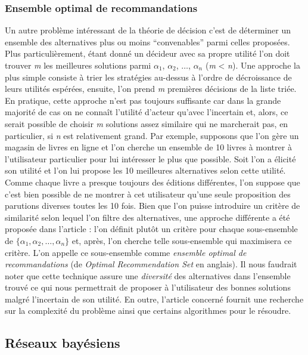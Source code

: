\documentclass[a4paper,11pt]{article}
\theoremstyle{plain}
\begin{document}
\subsubsection{Ensemble optimal de recommandations}
Un autre problème intéressant de la théorie de décision c’est de déterminer un ensemble des alternatives plus ou moins ``convenables'' parmi celles proposées. Plus particulièrement, étant donné un décideur avec sa propre utilité l’on doit trouver \emph{m} les meilleures solutions parmi $\alpha_1$, $\alpha_2$, $\dotsc$, $\alpha_n$ (\emph{m} < \emph{n}). Une approche la plus simple consiste à trier les stratégies au-dessus à l’ordre de décroissance de leurs utilités espérées, ensuite, l’on prend \emph{m} premières décisions de la liste triée. En pratique, cette approche n’est pas toujours suffisante \cite{price_optimal_2005} car dans la grande majorité de cas on ne connaît l’utilité d’acteur qu’avec l’incertain et, alors, ce serait possible de choisir \emph{m} solutions assez similaire qui ne marcherait pas, en particulier, si \emph{n} est relativement grand. Par exemple, supposons que l’on gère un magasin de livres en ligne et l’on cherche un ensemble de 10 livres à montrer à l’utilisateur particulier pour lui intéresser le plus que possible. Soit l’on a élicité son utilité et l’on lui propose les 10 meilleures alternatives selon cette utilité. Comme chaque livre a presque toujours des éditions différentes, l’on suppose que c’est bien possible de ne montrer à cet utilisateur qu’une seule proposition des parutions diverses toutes les 10 fois. Bien que l’on puisse introduire un critère de similarité selon lequel l’on filtre des alternatives, une approche différente a été proposée dans l’article \cite{price_optimal_2005} : l’on définit plutôt un critère pour chaque sous-ensemble de $\{\alpha_1, \alpha_2, \dotsc, \alpha_n\}$ et, après, l’on cherche telle sous-ensemble qui maximisera ce critère. L’on appelle ce sous-ensemble comme \emph{ensemble optimal de recommandations} (de \emph{Optimal Recommendation Set} en anglais). Il nous faudrait noter que cette technique assure une \emph{diversité} des alternatives dans l’ensemble trouvé ce qui nous permettrait de proposer à l’utilisateur des bonnes solutions malgré l’incertain de son utilité. En outre, l’article concerné fournit une recherche sur la complexité du problème ainsi que certains algorithmes pour le résoudre.

\subsection{Réseaux bayésiens}
\end{document}
